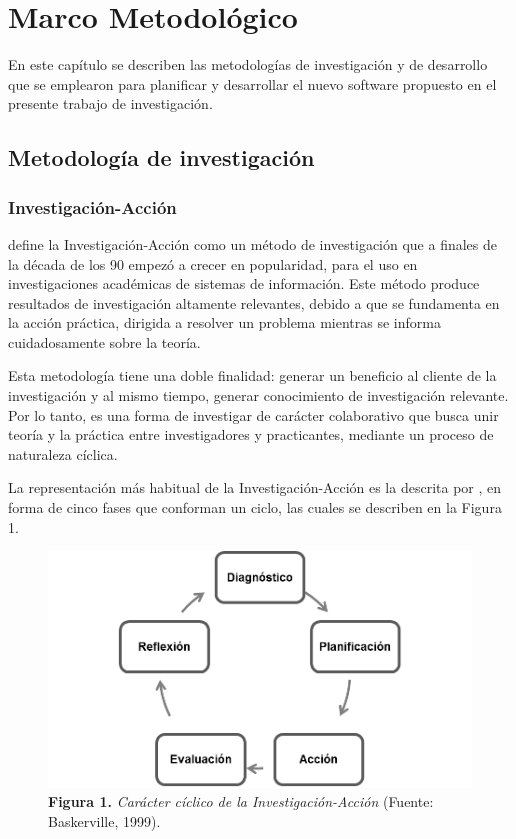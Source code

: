 \chapter{Marco Metodol\'{o}gico}
	
	En este cap\'{i}tulo se describen las metodolog\'{i}as de investigaci\'{o}n y de desarrollo que se emplearon para planificar y desarrollar el nuevo software propuesto en el presente trabajo de investigaci\'{o}n.
	
	\section{Metodolog\'{i}a de investigaci\'{o}n}
	
		\subsection{Investigaci\'{o}n-Acci\'{o}n}
	\cite{Baskerville} define la Investigaci\'{o}n-Acci\'{o}n como un m\'{e}todo de investigaci\'{o}n que a finales de la d\'{e}cada de los 90 empez\'{o} a crecer en popularidad, para el uso en investigaciones acad\'{e}micas de sistemas de informaci\'{o}n. Este m\'{e}todo produce resultados de investigaci\'{o}n altamente relevantes, debido a que se fundamenta en la acci\'{o}n pr\'{a}ctica, dirigida a resolver un problema mientras se informa cuidadosamente sobre la teor\'{i}a.

	Esta metodolog\'{i}a tiene una doble finalidad: generar un beneficio al cliente de la investigaci\'{o}n y al mismo tiempo, generar conocimiento de investigaci\'{o}n relevante. Por lo tanto, es una forma de investigar de car\'{a}cter colaborativo que busca unir teor\'{i}a y la pr\'{a}ctica entre investigadores y practicantes, mediante un proceso de naturaleza c\'{i}clica.

	La representaci\'{o}n m\'{a}s habitual de la Investigaci\'{o}n-Acci\'{o}n es la descrita por \cite{Baskerville}, en forma de cinco fases que conforman un ciclo, las cuales se describen en la Figura 1.

	\begin{figure}
		\centering
		\includegraphics[scale=0.77]{img/investigacion-accion.png}
			\caption{\textbf{Figura 1.} \textit{Car\'{a}cter c\'{i}clico de la Investigaci\'{o}n-Acci\'{o}n} (Fuente: Baskerville, 1999).}
	\end{figure}

